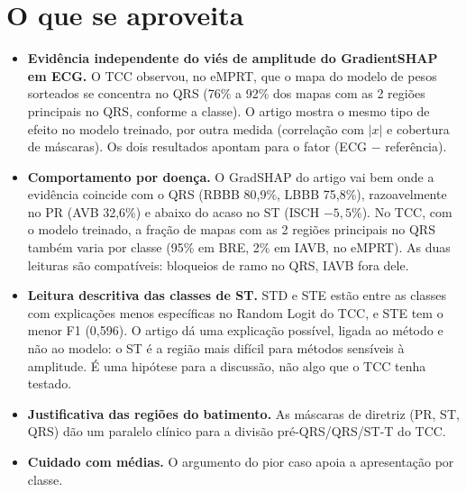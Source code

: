 \documentclass[11pt,a4paper]{article}
\begin{document}
\section{O que se aproveita}
\begin{itemize}
\item \textbf{Evidência independente do viés de amplitude do GradientSHAP em ECG.} O TCC observou, no eMPRT, que o mapa do modelo de pesos sorteados se concentra no QRS (76\% a 92\% dos mapas com as 2 regiões principais no QRS, conforme a classe). O artigo mostra o mesmo tipo de efeito no modelo treinado, por outra medida (correlação com $|x|$ e cobertura de máscaras). Os dois resultados apontam para o fator (ECG $-$ referência).
\item \textbf{Comportamento por doença.} O GradSHAP do artigo vai bem onde a evidência coincide com o QRS (RBBB 80,9\%, LBBB 75,8\%), razoavelmente no PR (AVB 32,6\%) e abaixo do acaso no ST (ISCH $-5{,}5$\%). No TCC, com o modelo treinado, a fração de mapas com as 2 regiões principais no QRS também varia por classe (95\% em BRE, 2\% em IAVB, no eMPRT). As duas leituras são compatíveis: bloqueios de ramo no QRS, IAVB fora dele.
\item \textbf{Leitura descritiva das classes de ST.} STD e STE estão entre as classes com explicações menos específicas no Random Logit do TCC, e STE tem o menor F1 (0,596). O artigo dá uma explicação possível, ligada ao método e não ao modelo: o ST é a região mais difícil para métodos sensíveis à amplitude. É uma hipótese para a discussão, não algo que o TCC tenha testado.
\item \textbf{Justificativa das regiões do batimento.} As máscaras de diretriz (PR, ST, QRS) dão um paralelo clínico para a divisão pré-QRS/QRS/ST-T do TCC.
\item \textbf{Cuidado com médias.} O argumento do pior caso apoia a apresentação por classe.
\end{itemize}
\end{document}
